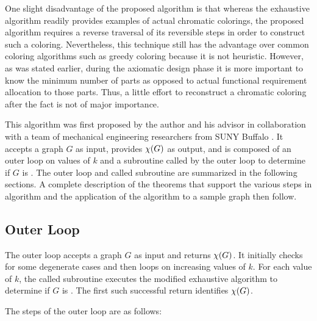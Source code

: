 One slight disadvantage of the proposed algorithm is that whereas the exhaustive algorithm readily provides
examples of actual chromatic colorings, the proposed algorithm requires a reverse traversal of its reversible steps
in order to construct such a coloring.  Nevertheless, this technique still has the advantage over common coloring
algorithms such as greedy coloring because it is not heuristic.  However, as was stated earlier, during the
axiomatic design phase it is more important to know the minimum number of parts as opposed to actual functional
requirement allocation to those parts.  Thus, a little effort to reconstruct a chromatic coloring after the fact is
not of major importance.

This algorithm was first proposed by the author and his advisor in collaboration with a team of mechanical
engineering researchers from SUNY Buffalo \cite{cavallaro}.  It accepts a graph \(G\) as input, provides \(\chi(G)\)
as output, and is composed of an outer loop on values of \(k\) and a subroutine called by the outer loop to
determine if \(G\) is .  The outer loop and called subroutine are summarized in the following
sections.  A complete description of the theorems that support the various steps in algorithm and the application
of the algorithm to a sample graph then follow.

\subsection{Outer Loop}

The outer loop accepts a graph \(G\) as input and returns \(\chi(G)\).  It initially checks for some degenerate cases
and then loops on increasing values of \(k\).  For each value of \(k\), the called subroutine executes the modified
exhaustive algorithm to determine if \(G\) is .  The first such successful return identifies
\(\chi(G)\).

The steps of the outer loop are as follows:

